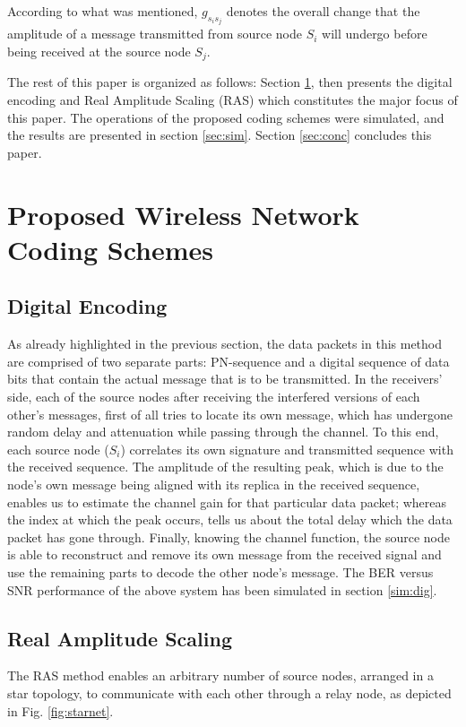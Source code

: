\documentclass[conference]{IEEEtran}
\begin{document}
According to what was mentioned, $g_{s_is_j}$ denotes the overall change that the amplitude of a message transmitted from source node $S_i$ will undergo before being received at the source node $S_j$.

The rest of this paper is organized as follows: Section \ref{proposed}, then presents the digital encoding and Real Amplitude Scaling (RAS) which constitutes the major focus of this paper. The operations of the proposed coding schemes were simulated, and the results are presented in section \ref{sec:sim}. Section \ref{sec:conc} concludes this paper. 
\section{Proposed Wireless Network Coding Schemes}\label{proposed}

\subsection{Digital Encoding}\label{sec:digitEnc}

As already highlighted in the previous section, the data packets in this method are comprised of two separate parts: PN-sequence and a digital sequence of data bits that contain the actual message that is to be transmitted. In the receivers' side, each of the source nodes after receiving the interfered versions of each other's messages, first of all tries to locate its own message, which has undergone random delay and attenuation while passing through the channel. To this end, each source node ($S_i$) correlates its own signature and transmitted sequence with the received sequence. The amplitude of the resulting peak, which is due to the node's own message being aligned with its replica in the received sequence, enables us to estimate the channel gain for that particular data packet; whereas the index at which the peak occurs, tells us about the total delay which the data packet has gone through. Finally, knowing the channel function, the source node is able to reconstruct and remove its own message from the received signal and use the remaining parts to decode the other node's message. The BER versus SNR performance of the above system has been simulated in section \ref{sim:dig}.

\subsection{Real Amplitude Scaling}\label{sec:RealNum}
The RAS method enables an arbitrary number of source nodes, arranged in a star topology, to communicate with each other through a relay node, as depicted in Fig. \ref{fig:starnet}. 
\end{document}
